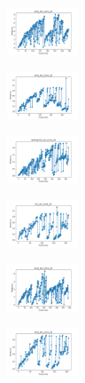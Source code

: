 \begin{figure}[H]
\begin{subfigure}
        \centering
        \includegraphics[width=0.234\textwidth]{img/ils/ecoli_set_const_20_589741062_time.png}
    \end{subfigure}
    \hfill
    \begin{subfigure}
        \centering
        \includegraphics[width=0.234\textwidth]{img/ils/rand_set_const_20_589741062_time.png}
    \end{subfigure}
    \hfill
    \begin{subfigure}
        \centering
        \includegraphics[width=0.234\textwidth]{img/ils/newthyroid_set_const_20_589741062_time.png}
    \end{subfigure}
    \hfill
    \begin{subfigure}
        \centering
        \includegraphics[width=0.234\textwidth]{img/ils/iris_set_const_20_277451237_time.png}
    \end{subfigure}
    \hfill
    \begin{subfigure}
        \centering
        \includegraphics[width=0.234\textwidth]{img/ils/ecoli_set_const_20_277451237_time.png}
    \end{subfigure}
    \hfill
    \begin{subfigure}
        \centering
        \includegraphics[width=0.234\textwidth]{img/ils/rand_set_const_20_277451237_time.png}

\end{subfigure}
\end{figure}
